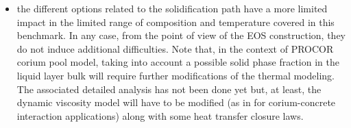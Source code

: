 \begin{itemize}
  \item the different options related to the solidification path have a more limited impact in the limited range of composition and temperature covered in this benchmark. In any case, from the point of view of the EOS construction, they do not induce additional difficulties. Note that, in the context of PROCOR corium pool model, taking into account a possible solid phase fraction in the liquid layer bulk will require further modifications of the thermal modeling. The associated detailed analysis has not been done yet but, at least, the dynamic viscosity model will have to be modified (as in \cite{Spindler2006} for corium-concrete interaction applications) along with some heat transfer closure laws.
\end{itemize}




